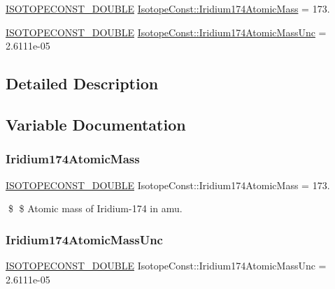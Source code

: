 \begin{DoxyCompactItemize}
\item 
\mbox{\hyperlink{group___isotope_const-_macros_ga8f45a7272ce02c0b4c65c44636ed719a}{I\+S\+O\+T\+O\+P\+E\+C\+O\+N\+S\+T\+\_\+\+D\+O\+U\+B\+LE}} \mbox{\hyperlink{group___isotope_const-_iridium-_ir174_ga4e70fc34ad60b5f0bfca5e1754733780}{Isotope\+Const\+::\+Iridium174\+Atomic\+Mass}} = 173.
\item 
\mbox{\hyperlink{group___isotope_const-_macros_ga8f45a7272ce02c0b4c65c44636ed719a}{I\+S\+O\+T\+O\+P\+E\+C\+O\+N\+S\+T\+\_\+\+D\+O\+U\+B\+LE}} \mbox{\hyperlink{group___isotope_const-_iridium-_ir174_gad5161fdc10e12001be7829c59b4e9762}{Isotope\+Const\+::\+Iridium174\+Atomic\+Mass\+Unc}} = 2.\+6111e-\/05
\end{DoxyCompactItemize}


\subsection{Detailed Description}


\subsection{Variable Documentation}
\mbox{\label{group___isotope_const-_iridium-_ir174_ga4e70fc34ad60b5f0bfca5e1754733780}} 
\subsubsection{\texorpdfstring{Iridium174\+Atomic\+Mass}{Iridium174AtomicMass}}
{\footnotesize\ttfamily \mbox{\hyperlink{group___isotope_const-_macros_ga8f45a7272ce02c0b4c65c44636ed719a}{I\+S\+O\+T\+O\+P\+E\+C\+O\+N\+S\+T\+\_\+\+D\+O\+U\+B\+LE}} Isotope\+Const\+::\+Iridium174\+Atomic\+Mass = 173.}

\$ \$ Atomic mass of Iridium-\/174 in amu. \mbox{\label{group___isotope_const-_iridium-_ir174_gad5161fdc10e12001be7829c59b4e9762}} 
\subsubsection{\texorpdfstring{Iridium174\+Atomic\+Mass\+Unc}{Iridium174AtomicMassUnc}}
{\footnotesize\ttfamily \mbox{\hyperlink{group___isotope_const-_macros_ga8f45a7272ce02c0b4c65c44636ed719a}{I\+S\+O\+T\+O\+P\+E\+C\+O\+N\+S\+T\+\_\+\+D\+O\+U\+B\+LE}} Isotope\+Const\+::\+Iridium174\+Atomic\+Mass\+Unc = 2.\+6111e-\/05}

